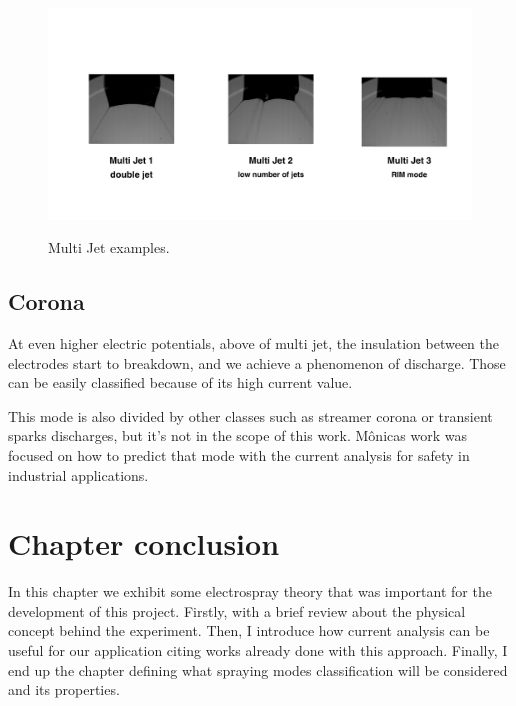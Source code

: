   \begin{figure}[H]
      \center
      \includegraphics[width=15cm]{Figuras/april/multjt.png}
      \label{fig:multijt}
      \caption{Multi Jet examples.}
  \end{figure}



\subsection{Corona}
\label{subsec:Corona}

At even higher electric potentials, above of multi jet, the insulation between the electrodes start to breakdown, and we achieve a phenomenon of discharge.
Those can be easily classified because of its high current value. 

This mode is also divided by other classes such as streamer corona or transient sparks discharges, but it's not in the scope of this work. 
Mônicas\cite{Monica} work was focused on how to predict that mode with the current analysis for safety in industrial applications.



\section{Chapter conclusion}

In this chapter we exhibit some electrospray theory that was important for the development of this project. 
Firstly, with a brief review about the physical concept behind the experiment. 
Then, I introduce how current analysis can be useful for our application citing works already done with this approach.
Finally, I end up the chapter defining what spraying modes classification will be considered and its properties.

\clearpage